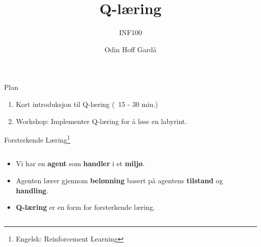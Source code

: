 \documentclass[UKenglish]{beamer}
\author{Odin Hoff Gardå}
\title{Q-læring}
\subtitle{INF100}
\begin{document}
\begin{frame}{Plan}

\vspace{4em}

\begin{enumerate}
	\setlength\itemsep{4em}
	\item \Large Kort introduksjon til Q-læring (~15 - 30 min.)
	\item \Large Workshop: Implementer Q-læring for å løse en labyrint.
\end{enumerate}

\end{frame}


\begin{frame}{Forsterkende Læring\footnote{Engelsk: Reinforcement Learning}}

\begin{columns}
	\begin{column}{0.5\textwidth}
		\begin{itemize}
			\setlength\itemsep{2.5em}
			\item Vi har en \textbf{agent} som \textbf{handler} i et \textbf{miljø}.
			\item Agenten lærer gjennom \textbf{belønning} basert på agentens \textbf{tilstand} og \textbf{handling}.
			\item \textbf{Q-læring} er en form for forsterkende læring.
		\end{itemize}
	\end{column}
	\begin{column}{0.5\textwidth}  %
		\begin{center}

		\end{center}
	\end{column}
\end{columns}
\end{frame}
\end{document}

